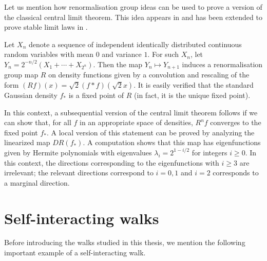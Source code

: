 \begin{example}
Let us mention how renormalisation group ideas can be used to prove a version
of the classical central limit theorem. This idea appears in \cite{JoLa01,KS07}
and has been extended to prove stable limit laws in \cite{LiSinai14}.

Let $X_n$ denote a sequence of independent identically distributed continuous random
variables with mean $0$ and variance $1$. For such $X_n$, let
$Y_n = 2^{-n/2} (X_1 + \cdots + X_{2^n})$. Then the map $Y_n \mapsto Y_{n+1}$
induces a renormalisation group map $R$ on density functions
given by a convolution and rescaling of the form $(R f)(x) = \sqrt2 (f * f)(\sqrt2 x)$.
It is easily verified that the standard Gaussian density $f_*$ is a fixed point of $R$
(in fact, it is the unique fixed point).

In this context, a subsequential version of the central limit theorem follows if
we can show that, for all $f$
in an appropriate space of densities, $R^n f$ converges to the fixed point $f_*$.
A local version of this statement can be proved by analyzing the linearized map
$D R(f_*)$. A computation shows that this map has eigenfunctions given by Hermite
polynomials with eigenvalues $\lambda_i = 2^{1-i/2}$ for integers $i \ge 0$.
In this context, the directions corresponding to the eigenfunctions with $i \ge 3$
are irrelevant; the relevant directions correspond to $i = 0, 1$ and $i = 2$ corresponds
to a marginal direction.
\end{example}


\section{Self-interacting walks}
\label{sec:walks}

Before introducing the walks studied in this thesis, we mention the following
important example of a self-interacting walk.


